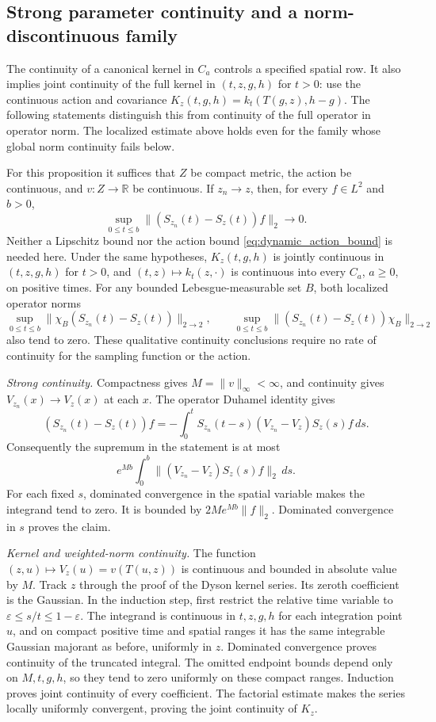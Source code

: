 \subsection{Strong parameter continuity and a norm-discontinuous family}
The continuity of a canonical kernel in $C_a$ controls a specified
spatial row. It also implies joint continuity of the full kernel in
$(t,z,g,h)$ for $t>0$: use the continuous action and covariance
$K_z(t,g,h)=k_t(T(g,z),h-g)$.
The following statements distinguish this from continuity of the full
operator in operator norm. The localized estimate above holds even
for the family whose global norm continuity fails below.

\begin{proposition}
\label{prop:dynamic_strong_parameter_continuity}
For this proposition it suffices that $Z$ be compact metric, the action
be continuous, and $v:Z\to\mathbb R$ be continuous. If $z_n\to z$,
then, for every $f\in L^2$ and $b>0$,
\[
\sup_{0\leq t\leq b}\|(S_{z_n}(t)-S_z(t))f\|_2\longrightarrow0.
\]
Neither a Lipschitz bound nor the action bound \eqref{eq:dynamic_action_bound}
is needed here.
Under the same hypotheses, $K_z(t,g,h)$ is jointly continuous in
$(t,z,g,h)$ for $t>0$, and $(t,z)\mapsto k_t(z,\cdot)$ is
continuous into every $C_a$, $a\geq0$, on positive times.
For any bounded Lebesgue-measurable set $B$, both localized operator
norms
\[
\sup_{0\leq t\leq b}
 \|\chi_B(S_{z_n}(t)-S_z(t))\|_{2\to2},\qquad
\sup_{0\leq t\leq b}
 \|(S_{z_n}(t)-S_z(t))\chi_B\|_{2\to2}
\]
also tend to zero. These qualitative continuity conclusions require
no rate of continuity for the sampling function or the action.
\end{proposition}
\Proof
\emph{Strong continuity.}
Compactness gives $M=\|v\|_\infty<\infty$, and continuity gives
$V_{z_n}(x)\to V_z(x)$ at each $x$. The operator Duhamel identity gives
\[
(S_{z_n}(t)-S_z(t))f
=-\int_0^t S_{z_n}(t-s)(V_{z_n}-V_z)S_z(s)f\,ds.
\]
Consequently the supremum in the statement is at most
\[
e^{Mb}\int_0^b\|(V_{z_n}-V_z)S_z(s)f\|_2\,ds.
\]
For each fixed $s$, dominated convergence in the spatial variable
makes the integrand tend to zero. It is bounded by
$2Me^{Mb}\|f\|_2$. Dominated convergence in $s$ proves the claim.

\emph{Kernel and weighted-norm continuity.}
The function $(z,u)\mapsto V_z(u)=v(T(u,z))$ is continuous and
bounded in absolute value by $M$. Track $z$ through the proof of
the Dyson kernel series. Its zeroth coefficient is the Gaussian.
In the induction step, first restrict the relative time variable to
$\varepsilon\leq s/t\leq1-\varepsilon$. The integrand is continuous
in $t,z,g,h$ for each integration point $u$, and on compact positive
time and spatial ranges it has the same integrable Gaussian majorant
as before, uniformly in $z$. Dominated convergence proves continuity
of the truncated integral. The omitted endpoint bounds depend only
on $M,t,g,h$, so they tend to zero uniformly on these compact ranges.
Induction proves joint continuity of every coefficient. The factorial
estimate makes the series locally uniformly convergent, proving the
joint continuity of $K_z$.

